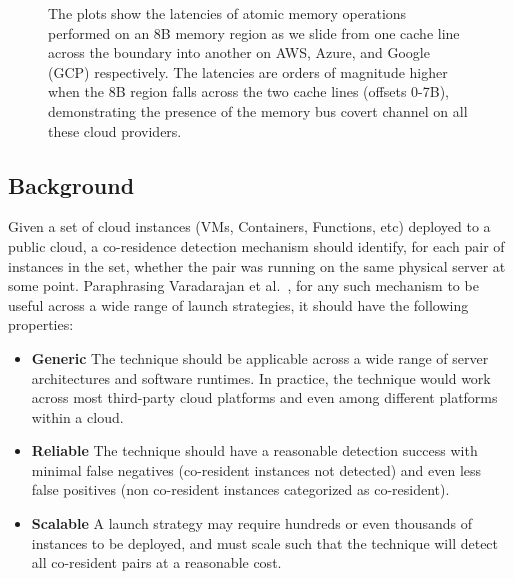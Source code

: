 \begin{figure}[h!]
\begin{subfigure}{.33\textwidth}
\end{subfigure}
\caption{The plots show the latencies of atomic memory operations performed on
        an 8B memory region as we slide from one cache line across the boundary into
        another on AWS, Azure, and Google (GCP) respectively.  The latencies are orders
        of magnitude higher when the 8B region falls across the two cache lines (offsets
        0-7B), demonstrating the presence of the memory bus covert channel on all these
        cloud providers. \label{fig:membus_clouds}}
\label{fig:fig}
\end{figure}



\subsection{Background}
Given a set of cloud instances (VMs, Containers, Functions, etc) deployed to a
public cloud, a co-residence detection mechanism should identify, for each pair
of instances in the set, whether the pair was running on the same physical
server at some point. Paraphrasing Varadarajan et al.~\cite{varadarajan2015},
for any such mechanism to be useful across a wide range of launch strategies, it
should have the following properties:

\begin{itemize}
    \item \textbf{Generic} The technique should be applicable across a wide
    range of server architectures and software runtimes. In practice, the
    technique would work across most third-party cloud platforms and even among different
    platforms within a cloud.
    \item \textbf{Reliable} The technique should have a reasonable detection success
    with minimal false negatives (co-resident instances not detected) and even 
    less false positives (non co-resident instances categorized as co-resident).
    \item \textbf{Scalable} A launch strategy may require hundreds or even
    thousands of instances to be deployed, and must scale such that the
    technique will detect all co-resident pairs at a reasonable cost.
\end{itemize}

